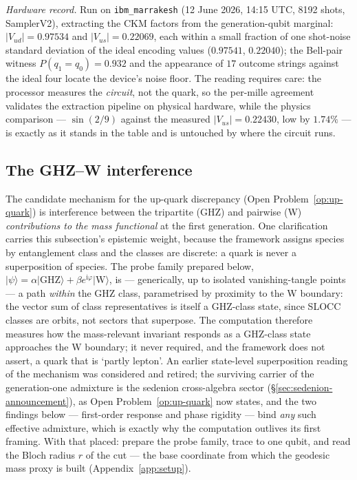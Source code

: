 \emph{Hardware record.} Run on \texttt{ibm\_marrakesh} (12 June 2026, 14:15 UTC, 8192 shots,
SamplerV2), extracting the CKM factors from the generation-qubit marginal:
$\lvert V_{ud}\rvert = 0.97534$ and $\lvert V_{us}\rvert = 0.22069$, each within a small fraction
of one shot-noise standard deviation of the ideal encoding values ($0.97541$, $0.22040$); the
Bell-pair witness $P(q_1{=}q_0) = 0.932$ and the appearance of $17$ outcome strings against the
ideal four locate the device's noise floor. The reading requires care: the processor measures the
\emph{circuit}, not the quark, so the per-mille agreement validates the extraction pipeline on
physical hardware, while the physics comparison --- $\sin(2/9)$ against the measured
$\lvert V_{us}\rvert = 0.22430$, low by $1.74\%$ --- is exactly as it stands in the table and is
untouched by where the circuit runs.

\subsection{The GHZ--W interference}
\label{app:qiskit-interference}

The candidate mechanism for the up-quark discrepancy (Open Problem~\ref{op:up-quark}) is
interference between the tripartite (GHZ) and pairwise (W) \emph{contributions to the mass
functional} at the first generation. One clarification carries this subsection's epistemic
weight, because the framework assigns species by entanglement class and the classes are discrete:
a quark is never a superposition of species. The probe family prepared below,
$\lvert\psi\rangle = \alpha\lvert\mathrm{GHZ}\rangle + \beta e^{\mathrm{i}\varphi}\lvert\mathrm{W}\rangle$,
is --- generically, up to isolated vanishing-tangle points --- a path \emph{within} the GHZ
class, parametrised by proximity to the W boundary: the vector sum of class representatives is
itself a GHZ-class state, since SLOCC classes are orbits, not sectors that superpose. The
computation therefore measures how the mass-relevant invariant responds as a GHZ-class state
approaches the W boundary; it never required, and the framework does not assert, a quark that is
`partly lepton'. An earlier state-level superposition reading of the mechanism was considered and
retired; the surviving carrier of the generation-one admixture is the sedenion cross-algebra
sector (\S\ref{sec:sedenion-announcement}), as Open Problem~\ref{op:up-quark} now states, and
the two findings below --- first-order response and phase rigidity --- bind \emph{any} such
effective admixture, which is exactly why the computation outlives its first framing. With that
placed: prepare the probe family, trace to one qubit, and read the Bloch radius $r$ of the cut
--- the base coordinate from which the geodesic mass proxy is built (Appendix~\ref{app:setup}).

